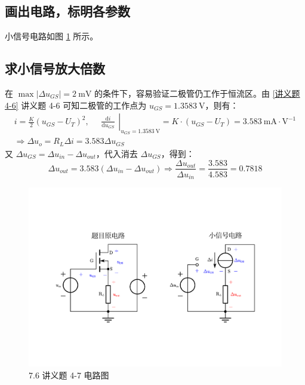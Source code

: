 \documentclass[UTF8]{report}
\def\mV{\ \mathrm{mV}}
\theoremstyle{MyLineTheoremStyle} %
\theoremstyle{MyBlockTheoremStyle} %
\theoremstyle{MySubsubsectionStyle} %
\begin{document}
\subsection{画出电路，标明各参数}
小信号电路如图 \ref{7.6 讲义题 4-7 电路图} 所示。

\subsection{求小信号放大倍数}

在 $\max | \Delta u_{GS} | = 2 \mV$ 的条件下，容易验证二极管仍工作于恒流区。由 \ref{讲义题 4-6} 讲义题 4-6 可知二极管的工作点为 $u_{GS} = 1.3583 \ \mathrm{V}$，则有：
\begin{gather}
i = \frac{K}{2}\left(u_{GS} - U_T\right)^2,\quad 
\left.\begin{matrix}
    \frac{\mathrm{d} i }{\mathrm{d} u_{GS} } 
\end{matrix}\right|_{u_{GS} = 1.3583 \ \mathrm{V}} = K\cdot(u_{GS} - U_T) = 3.583 \ \mathrm{mA\cdot V^{-1}} \\ 
\Longrightarrow 
\Delta u_o = R_L \Delta i = 3.583 \Delta u_{GS}
\end{gather}
又 $\Delta u_{GS} = \Delta u_{in} - \Delta u_{out}$，代入消去 $\Delta u_{GS}$，得到：
\begin{equation}
\Delta u_{out} = 3.583\left(\Delta u_{in} - \Delta u_{out}\right) \Longrightarrow \frac{\Delta u_{out}}{\Delta u_{in}} = \frac{3.583}{4.583} = 0.7818
\end{equation}

\begin{figure}[H]\centering
\includegraphics[width=0.8\columnwidth]{assets/7/讲义题4-7.pdf}
\caption{7.6 讲义题 4-7 电路图}\label{7.6 讲义题 4-7 电路图}
\end{figure}
\end{document}

